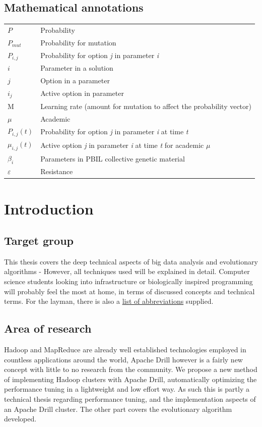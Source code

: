 \documentclass[a4paper,english]{report}
\begin{document}
	\section{Mathematical annotations}
	\label{table:annotations}
	\begin{table}[h]
		\centering
		\begin{tabular}{ll}
			$P$	& Probability \\
			$P_{mut}$	& Probability for mutation \\
			$P_{i,j}$	& Probability for option \textit{j} in parameter \textit{i} \\
			$i$  & Parameter in a solution \\
			$j$ & Option in a parameter \\
			$i_{j}$ & Active option in parameter \\
			M & Learning rate (amount for mutation to affect the probability vector) \\
			$\mu$ & Academic \\
			$P_{i,j}(t)$ & Probability for option \textit{j} in parameter \textit{i} at time \textit{t} \\
			$\mu_{i,j}(t)$ & Active option \textit{j} in parameter \textit{i} at time \textit{t} for academic $\mu$ \\
			$\beta_{i}$ & Parameters in PBIL collective genetic material \\
			$\varepsilon$ & Resistance
			
		\end{tabular}
	\end{table}

	
	\chapter{Introduction}
		
		\section{Target group}
		This thesis covers the deep technical aspects of big data analysis and evolutionary algorithms - However, all techniques used will be explained in detail. Computer science students looking into infrastructure or biologically inspired programming will probably feel the most at home, in terms of discussed concepts and technical terms. For the layman, there is also a \hyperref[word_list]{list of abbreviations} supplied.
		
		\section{Area of research}
		Hadoop and MapReduce are already well established technologies employed in countless applications around the world, Apache Drill however is a fairly new concept with little to no research from the community. We propose a new method of implementing Hadoop clusters with Apache Drill, automatically optimizing the performance tuning in a lightweight and low effort way. As such this is partly a technical thesis regarding performance tuning, and the implementation aspects of an Apache Drill cluster. The other part covers the evolutionary algorithm developed.
		
\end{document}
